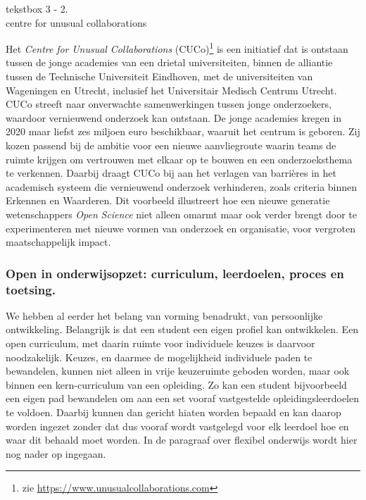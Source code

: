 \documentclass[smallauthor, chapterhaspagenum, nochapterinheader, pagenuminheader,  bigchapnum,medium2, tocpages, garamond, titleinheader]{jote-book}
\begin{document}
	\begin{bookbox}{\raggedright tekstbox 3 - 2. \\centre for unusual collaborations}
		Het \emph{Centre }\emph{for}\emph{ }\emph{Unusual}\emph{ }\emph{Collaborations} (CUCo)\footnote{zie \href{https://www.unusualcollaborations.com}{https://www.unusualcollaborations.com} } is een initiatief dat is ontstaan tussen de jonge academies van een drietal universiteiten, binnen de alliantie tussen de Technische Universiteit Eindhoven, met de universiteiten van Wageningen en Utrecht, inclusief het Universitair Medisch Centrum Utrecht. CUCo streeft naar onverwachte samenwerkingen tussen jonge onderzoekers, waardoor vernieuwend onderzoek kan ontstaan. De jonge academies kregen in 2020 maar liefst zes miljoen euro beschikbaar, waaruit het centrum is geboren. Zij kozen passend bij de ambitie voor een nieuwe aanvliegroute waarin teams de ruimte krijgen om vertrouwen met elkaar op te bouwen en een onderzoeksthema te verkennen. Daarbij draagt CUCo bij aan het verlagen van barrières in het academisch systeem die vernieuwend onderzoek verhinderen, zoals criteria binnen Erkennen en Waarderen. Dit voorbeeld illustreert hoe een nieuwe generatie wetenschappers \emph{Open }\emph{Science} niet alleen omarmt maar ook verder brengt door te experimenteren met nieuwe vormen van onderzoek en organisatie, voor vergroten maatschappelijk impact.
	\end{bookbox}

	\subsubsection{Open in onderwijsopzet: curriculum, leerdoelen, proces en toetsing. }



	We hebben al eerder het belang van vorming benadrukt, van persoonlijke ontwikkeling. Belangrijk is dat een student een eigen profiel kan ontwikkelen. Een open curriculum, met daarin ruimte voor individuele keuzes is daarvoor noodzakelijk. Keuzes, en daarmee de mogelijkheid individuele paden te bewandelen, kunnen niet alleen in vrije keuzeruimte geboden worden, maar ook binnen een kern-curriculum van een opleiding. Zo kan een student bijvoorbeeld een eigen pad bewandelen om aan een set vooraf vastgestelde opleidingsleerdoelen te voldoen. Daarbij kunnen dan gericht hiaten worden bepaald en kan daarop worden ingezet zonder dat dus vooraf wordt vastgelegd voor elk leerdoel hoe en waar dit behaald moet worden. In de paragraaf over flexibel onderwijs wordt hier nog nader op ingegaan.
\end{document}
